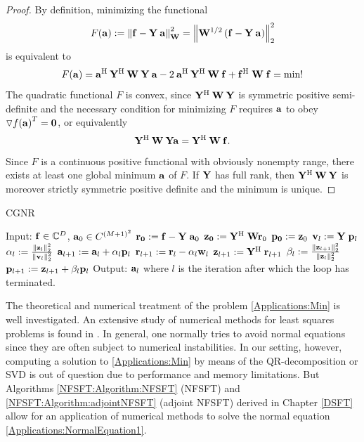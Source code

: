   \begin{proof}
    By definition, minimizing the functional 
    \[
      F{\hspace{-0.4ex}}\left(\mathbf{a}\right) := \left\|\mathbf{f} - \mathbf{Y}\:\mathbf{a}\right\|_{\mathbf{W}}^2 = 
      \left\|\mathbf{W}^{1/2}\left(\mathbf{f} - \mathbf{Y}\:\mathbf{a}\right)\right\|_2^2
    \]  
    is equivalent to
    \[
      F{\hspace{-0.4ex}}\left(\mathbf{a}\right) = \mathbf{a}^{\text{\rm{H}}} \: \mathbf{Y}^{\text{\rm{H}}} \: \mathbf{W} \: \mathbf{Y} \: \mathbf{a} - 
      2 \: \mathbf{a}^{\text{\rm{H}}} \: \mathbf{Y}^{\text{\rm{H}}} \: \mathbf{W} \: \mathbf{f} +  \mathbf{f}^{\text{\rm{H}}} \; 
      \mathbf{W} \; \mathbf{f} = \text{min!}
    \]
    The quadratic functional $F$ is convex, since 
    $\mathbf{Y}^{\text{\rm{H}}} \: \mathbf{W} \: \mathbf{Y}$ is symmetric positive semi-definite 
    and the necessary condition for minimizing $F$ requires $\mathbf{a}$ to obey 
    $\triangledown f{\hspace{-0.4ex}}\left(\mathbf{a}\right)^T = \mathbf{0}$, or equivalently
    \[
      \mathbf{Y^{\text{\rm{H}}}} \: \mathbf{W} \: \mathbf{Y} \mathbf{a} = \mathbf{Y^{\text{\rm{H}}}} \: \mathbf{W} \: \mathbf{f}.
    \]
    Since $F$ is a continuous positive functional with obviously nonempty range, there 
    exists at least one global minimum $\mathbf{a}$ of $F$. If $\mathbf{Y}$ has full rank,
    then $\mathbf{Y}^{\text{\rm{H}}} \: \mathbf{W} \: \mathbf{Y}$ is moreover strictly symmetric positive 
    definite and the minimum is unique.
  \end{proof}

  \begin{algorithm}[tb]
    \caption{CGNR}
    \label{Applications:Algorithm:CGNR}    
	  \begin{algorithmic}
	    \STATE  Input:  $\mathbf{f} \in \mathbb{C}^{D}$, $\mathbf{a}_{0} \in C^{(M+1)^2}$
	    \STATE
	    \STATE $\mathbf{r_{0}} := \mathbf{f} - \mathbf{Y} \; \mathbf{a}_{0}$
	    \STATE $\mathbf{z_{0}} := \mathbf{Y}^{\text{\rm{H}}} \; \mathbf{W} \mathbf{r}_{0}$
	    \STATE $\mathbf{p_{0}} := \mathbf{z}_{0}$
	    \STATE 
	      \STATE $\mathbf{v}_{l} := \mathbf{Y} \; \mathbf{p}_{l}$
	      \STATE $\alpha_{l} := \frac{\left\|\mathbf{z}_{l}\right\|_{2}^2}{\left\|\mathbf{v}_{l}\right\|_{2}^2}$  
	      \STATE $\mathbf{a}_{l+1} := \mathbf{a}_{l} + \alpha_{l} \mathbf{p}_{l}$
	      \STATE $\mathbf{r}_{l+1} := \mathbf{r}_{l} - \alpha_{l} \mathbf{w}_{l}$
	      \STATE $\mathbf{z}_{l+1} := \mathbf{Y}^{\text{\rm{H}}} \; \mathbf{r}_{l+1}$
	      \STATE $\beta_{l}   := \frac{\left\|\mathbf{z}_{l+1}\right\|_{2}^2}{\left\|\mathbf{z}_{l}\right\|_{2}^2}$
	      \STATE $\mathbf{p}_{l+1} := \mathbf{z}_{l+1} + \beta_{l} \mathbf{p}_{l}$
	    \ENDFOR
	    \STATE
	    \STATE Output: $\mathbf{a}_{l}$ where $l$ is the iteration after which the loop has terminated.
	  \end{algorithmic}
  \end{algorithm}
  
  The theoretical and numerical treatment of the problem \eqref{Applications:Min}
  is well investigated. An extensive study of numerical methods for least 
  squares problems is found in \cite{bjoerk}. In general, one normally tries to
  avoid normal equations since they are often subject to numerical instabilities. In
  our setting, however, computing a solution to \eqref{Applications:Min}
  by means of the QR-decomposition or SVD is out of question due to performance and memory limitations. 
  But Algorithms \ref{NFSFT:Algorithm:NFSFT} (NFSFT) and \ref{NFSFT:Algorithm:adjointNFSFT} 
  (adjoint NFSFT) derived in Chapter \ref{DSFT} allow for an application of 
  numerical methods to solve the normal equation \eqref{Applications:NormalEquation1}. 
  
